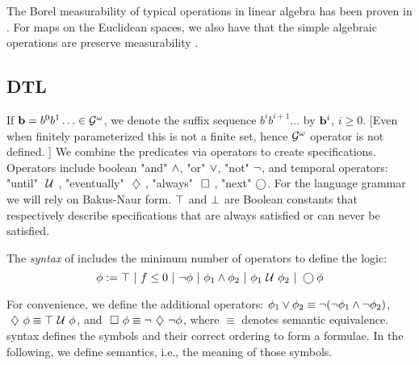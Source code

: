 \documentclass[conference]{IEEEtran}
\newcommand{\red}[1]{{\color{red} #1}}
\begin{document}
    The Borel measurability of typical operations in linear algebra 
   has been proven in \cite{azoff1974borel}.
For maps on the Euclidean spaces, we also have that the simple algebraic operations are preserve measurability \cite[page 116]{lang1993real}.
  
    \subsection{DTL}    
    If $\mathbf{b} = b^0b^1 \ldots \in \mathcal{G}^{\omega}$,
    we denote the suffix sequence $b^i b^{i+1} \ldots$ by
    $\mathbf{b}^i$, $i \geq 0$.  \red{[Even when finitely parameterized this is not a finite set, hence $\mathcal{G}^{\omega}$ operator is not defined. ]}
   We  combine the predicates via operators to create specifications. Operators include boolean "and" $\wedge$, "or" $\vee$, "not" $\neg$, and temporal operators: "until" $\ \mathcal{U}\ $, "eventually" $\ \diamondsuit\ $, "always" $\ \square\ $, "next" $\bigcirc$.
      For the language grammar we will rely on Bakus-Naur form. $\top$ and $\perp$ are Boolean constants that respectively describe specifications that are always satisfied or can never be satisfied.
    
    \begin{definition}
    \label{def:gdtl-syntax}
    The {\em syntax} of \DTL includes the minimum number of operators to define the logic:
    \begin{equation*}
     \phi :=  \top \ |\ f \leq 0 \ |\ \neg \phi \ |\ \phi_1 \wedge \phi_2 \ |\ \phi_1 \ \mathcal{U}\  \phi_2 \ |\ \bigcirc \phi
    \end{equation*}
    \end{definition}

    For convenience, we define the additional operators:
    $\phi_1 \vee \phi_2 \equiv  \neg (\neg \phi_1 \wedge \neg \phi_2)$,
    $\ \diamondsuit\  \phi \equiv \top \ \mathcal{U}\  \phi$, and
    $\ \square\  \phi \equiv \neg \ \diamondsuit\  \neg \phi$,
    where $\equiv$ denotes semantic equivalence. \DTL syntax defines the symbols and their correct ordering to form a formulae. In the following, we define \DTL semantics, i.e., the meaning of those symbols.
\end{document}
